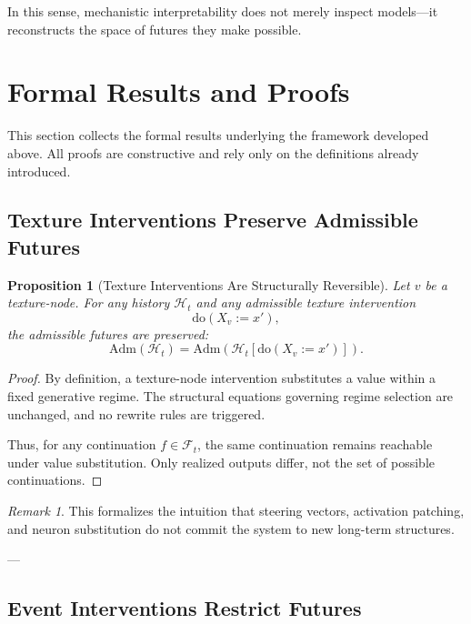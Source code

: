\documentclass[11pt]{article}
\newtheorem{proposition}{Proposition}
\theoremstyle{remark}
\newtheorem{remark}{Remark}
\newcommand{\doop}{\mathrm{do}}
\newcommand{\Adm}{\mathrm{Adm}}
\newcommand{\Hist}{\mathcal{H}}
\newcommand{\Fut}{\mathcal{F}}
\begin{document}
In this sense, mechanistic interpretability does not merely inspect models—it reconstructs the space of futures they make possible.

\section{Formal Results and Proofs}

This section collects the formal results underlying the framework developed above.
All proofs are constructive and rely only on the definitions already introduced.

\subsection{Texture Interventions Preserve Admissible Futures}

\begin{proposition}[Texture Interventions Are Structurally Reversible]
Let \(v\) be a texture-node. For any history \(\Hist_t\) and any admissible texture intervention
\[
\doop(X_v := x'),
\]
the admissible futures are preserved:
\[
\Adm(\Hist_t) = \Adm(\Hist_t[\doop(X_v := x')]).
\]
\end{proposition}

\begin{proof}
By definition, a texture-node intervention substitutes a value within a fixed generative regime.
The structural equations governing regime selection are unchanged, and no rewrite rules are triggered.

Thus, for any continuation \(f \in \Fut_t\), the same continuation remains reachable under value substitution.
Only realized outputs differ, not the set of possible continuations.
\end{proof}

\begin{remark}
This formalizes the intuition that steering vectors, activation patching, and neuron substitution
do not commit the system to new long-term structures.
\end{remark}

---

\subsection{Event Interventions Restrict Futures}
\end{document}
